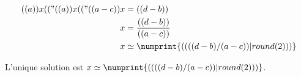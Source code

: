 \exercice*

\begin{align*}
  (( a )) x (( "%
  (( a )) x (( "%
  (( a - c )) x &= (( d - b )) \\
  x &= \frac{(( d - b ))}{(( a - c ))} \\
  x &\simeq \numprint{(( ((d-b)/(a-c)) | round(2) ))}
\end{align*}

L'unique solution est $x\simeq\numprint{(( ((d-b)/(a-c)) | round(2) ))}$.
